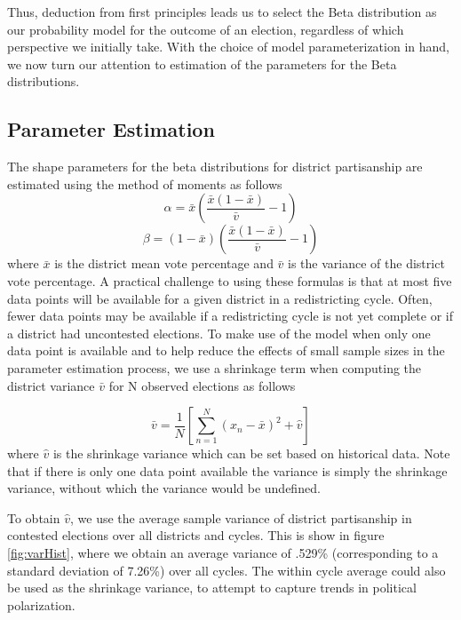\documentclass[preprint,12pt]{article}
\begin{document}
Thus, deduction from first principles leads us to select the Beta distribution as our probability model for the outcome of an election, regardless of which perspective we initially take.
With the choice of model parameterization in hand, we now turn our attention to estimation of the parameters for the Beta distributions.

\subsection{Parameter Estimation}
The shape parameters for the beta distributions for district partisanship are estimated using the method of moments as follows
\begin{equation}
    \alpha = \bar{x} \left(\frac{\bar{x}\left(1-\bar{x}\right)}{\bar{v}}-1\right)
\end{equation}
\begin{equation}
    \beta = \left(1-\bar{x}\right) \left(\frac{\bar{x}\left(1-\bar{x}\right)}{\bar{v}}-1\right)
\end{equation}
where $\bar{x}$ is the district mean vote percentage and $\bar{v}$ is the variance of the district vote percentage.
A practical challenge to using these formulas is that at most five data points will be available for a given district in a redistricting cycle.
Often, fewer data points may be available if a redistricting cycle is not yet complete or if a district had uncontested elections.
To make use of the model when only one data point is available and to help reduce the effects of small sample sizes in the parameter estimation process, we use a shrinkage term when computing the district variance $\bar{v}$ for N observed elections as follows

\begin{equation}
    \bar{v} = \frac{1}{N}\left[\sum_{n=1}^{N}\left(x_{n}-\bar{x}\right)^{2}+\hat{v}\right]
\end{equation}
where $\hat{v}$ is the shrinkage variance which can be set based on historical data.
Note that if there is only one data point available the variance is simply the shrinkage variance, without which the variance would be undefined.

To obtain $\hat{v}$, we use the average sample variance of district partisanship in contested elections over all districts and cycles.
This is show in figure \ref{fig:varHist}, where we obtain an average variance of .529\% (corresponding to a standard deviation of 7.26\%) over all cycles.
The within cycle average could also be used as the shrinkage variance, to attempt to capture trends in political polarization.
\end{document}
